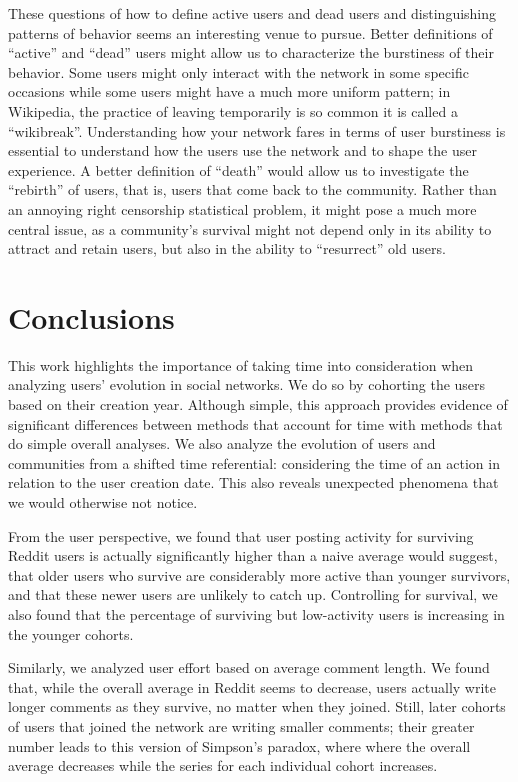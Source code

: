 These questions of how to define active users and dead users and distinguishing patterns of behavior seems an interesting venue to pursue. Better definitions of ``active'' and ``dead'' users might allow us to characterize the burstiness of their behavior.  Some users might only interact with the network in some specific occasions while some users might have a much more uniform pattern; in Wikipedia, the practice of leaving temporarily is so common it is called a ``wikibreak''. Understanding how your network fares in terms of user burstiness is essential to understand how the users use the network and to shape the user experience.  A better definition of ``death'' would allow us to investigate the ``rebirth'' of users, that is, users that come back to the community.  Rather than an annoying right censorship statistical problem, it might pose a much more central issue, as a community's survival might not depend only in its ability to attract and retain users, but also in the ability to ``resurrect'' old users.

\section{Conclusions}

This work highlights the importance of taking time into consideration when analyzing users' evolution in social networks. We do so by cohorting the users based on their creation year. Although simple, this approach provides evidence of significant differences between methods that account for time with methods that do simple overall analyses.  We also analyze the evolution of users and communities from a shifted time referential: considering the time of an action in relation to the user creation date. This also reveals unexpected phenomena that we would otherwise not notice.

From the user perspective, we found that user posting activity for surviving Reddit users is actually significantly higher than a naive average would suggest, that older users who survive are considerably more active than younger survivors, and that these newer users are unlikely to catch up.   Controlling for survival, we also found that the percentage of surviving but low-activity users is increasing in the younger cohorts.  

Similarly, we analyzed user effort based on average comment length. We found that, while the overall average in Reddit seems to decrease, users actually write longer comments as they survive, no matter when they joined.  Still, later cohorts of users that joined the network are writing smaller comments; their greater number leads to this version of Simpson's paradox, where where the overall average decreases while the series for each individual cohort increases. 

